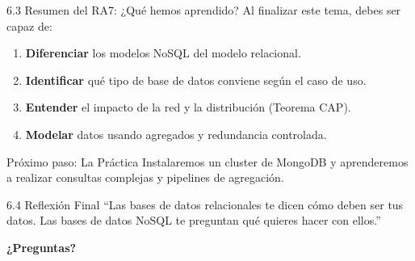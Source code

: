 \begin{frame}{6.3 Resumen del RA7: ¿Qué hemos aprendido?}
    Al finalizar este tema, debes ser capaz de:
    \begin{enumerate}
        \item \textbf{Diferenciar} los modelos NoSQL del modelo relacional.
        \item \textbf{Identificar} qué tipo de base de datos conviene según el caso de uso.
        \item \textbf{Entender} el impacto de la red y la distribución (Teorema CAP).
        \item \textbf{Modelar} datos usando agregados y redundancia controlada.
    \end{enumerate}
    \begin{exampleblock}{Próximo paso: La Práctica}
        Instalaremos un cluster de MongoDB y aprenderemos a realizar consultas complejas y pipelines de agregación.
    \end{exampleblock}
\end{frame}

\begin{frame}{6.4 Reflexión Final}
    ``Las bases de datos relacionales te dicen cómo deben ser tus datos. Las bases de datos NoSQL te preguntan qué quieres hacer con ellos.''
    
    \vspace{0.8cm}
    \begin{center}
        \Large \textbf{¿Preguntas?}
    \end{center}
\end{frame}
